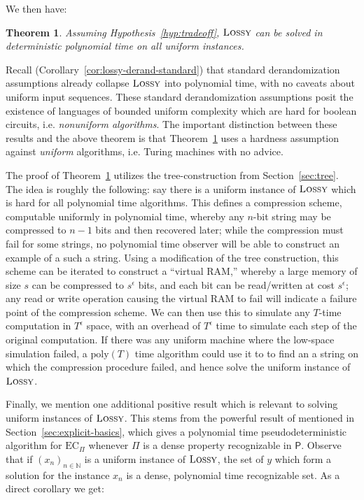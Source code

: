 \documentclass[11pt]{article}
\newtheorem{theorem}{Theorem}
\newcommand{\poly}{\mathrm{poly}}
\newcommand{\ec}{\mathrm{EC}_\Pi}
\newcommand{\lossy}{\textsc{Lossy}}
\begin{document}
We then have:
\begin{theorem}\label{thm:time-space}\cite{Korten2}
Assuming Hypothesis~\ref{hyp:tradeoff}, $\lossy$ can be solved in deterministic polynomial time on all uniform instances. 
\end{theorem}

Recall (Corollary~\ref{cor:lossy-derand-standard}) that standard derandomization assumptions already collapse $\lossy$ into polynomial time, with no caveats about uniform input sequences. These standard derandomization assumptions posit the existence of languages of bounded uniform complexity which are hard for boolean circuits, i.e. \emph{nonuniform algorithms}. The important distinction between these results and the above theorem is that Theorem~\ref{thm:time-space} uses a hardness assumption against \emph{uniform} algorithms, i.e. Turing machines with no advice. 

The proof of Theorem~\ref{thm:time-space} utilizes the tree-construction from Section~\ref{sec:tree}. The idea is roughly the following: say there is a uniform instance of $\lossy$ which is hard for all polynomial time algorithms. This defines a compression scheme, computable uniformly in polynomial time, whereby any $n$-bit string may be compressed to $n-1$ bits and then recovered later; while the compression must fail for some strings, no polynomial time observer will be able to construct an example of a such a string. Using a modification of the tree construction, this scheme can be iterated to construct a ``virtual RAM,'' whereby a large memory of size $s$ can be compressed to $s^\epsilon$ bits, and each bit can be read/written at cost $s^\epsilon$; any read or write operation causing the virtual RAM to fail will indicate a failure point of the compression scheme. We can then use this to simulate any $T$-time computation in $T^{\epsilon}$ space, with an overhead of $T^{\epsilon}$ time to simulate each step of the original computation. If there was any uniform machine where the low-space simulation failed, a $\poly(T)$ time algorithm could use it to to find an a string on which the compression procedure failed, and hence solve the uniform instance of $\lossy$.

Finally, we mention one additional positive result which is relevant to solving uniform instances of $\lossy$. This stems from the powerful result of \cite{pseudo-primes} mentioned in Section~\ref{sec:explicit-basics}, which gives a polynomial time pseudodeterministic algorithm for $\ec$ whenever $\Pi$ is a dense property recognizable in $\mathsf{P}$. Observe that if $(x_n)_{n \in \mathbb{N}}$ is a uniform instance of $\lossy$, the set of $y$ which form a solution for the instance $x_n$ is a dense, polynomial time recognizable set. As a direct corollary we get:
\end{document}
